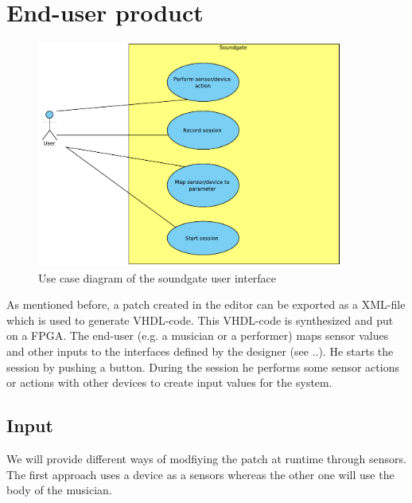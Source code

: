 \section{End-user product}

	\begin{figure}[!h]
		\centering
			\includegraphics[width=0.90\textwidth]{images/User_View.pdf}
		\caption{Use case diagram of the soundgate user interface}
		\label{fig:Soundgate_UserInterface}
	\end{figure}
	
	As mentioned before, a patch created in the editor can be exported as a XML-file which is used to generate VHDL-code. This VHDL-code is synthesized and put on a FPGA. The end-user (e.g. a musician or a performer) maps sensor values and other inputs to the interfaces defined by the designer (see ..). He starts the session by pushing a button. During the session he performs some sensor actions or actions with other devices to create input values for the system.
	
\subsection{Input}
We will provide different ways of modfiying the patch at runtime through sensors. The first approach uses a device as a sensors whereas the other one will use the body of the musician. 

